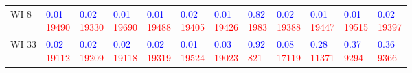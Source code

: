 \begin{tabular}{llllllllllll}
WI 8 & \makecell{\textcolor{blue}{0.01} \\ \textcolor{red}{19490}} & \makecell{\textcolor{blue}{0.02} \\ \textcolor{red}{19330}} & \makecell{\textcolor{blue}{0.01} \\ \textcolor{red}{19690}} & \makecell{\textcolor{blue}{0.01} \\ \textcolor{red}{19488}} & \makecell{\textcolor{blue}{0.02} \\ \textcolor{red}{19405}} & \makecell{\textcolor{blue}{0.01} \\ \textcolor{red}{19426}} & \makecell{\textcolor{blue}{0.82} \\ \textcolor{red}{1983}} & \makecell{\textcolor{blue}{0.02} \\ \textcolor{red}{19388}} & \makecell{\textcolor{blue}{0.01} \\ \textcolor{red}{19447}} & \makecell{\textcolor{blue}{0.01} \\ \textcolor{red}{19515}} & \makecell{\textcolor{blue}{0.02} \\ \textcolor{red}{19397}} \\
WI 33 & \makecell{\textcolor{blue}{0.02} \\ \textcolor{red}{19112}} & \makecell{\textcolor{blue}{0.02} \\ \textcolor{red}{19209}} & \makecell{\textcolor{blue}{0.02} \\ \textcolor{red}{19118}} & \makecell{\textcolor{blue}{0.02} \\ \textcolor{red}{19319}} & \makecell{\textcolor{blue}{0.01} \\ \textcolor{red}{19524}} & \makecell{\textcolor{blue}{0.03} \\ \textcolor{red}{19023}} & \makecell{\textcolor{blue}{0.92} \\ \textcolor{red}{821}} & \makecell{\textcolor{blue}{0.08} \\ \textcolor{red}{17119}} & \makecell{\textcolor{blue}{0.28} \\ \textcolor{red}{11371}} & \makecell{\textcolor{blue}{0.37} \\ \textcolor{red}{9294}} & \makecell{\textcolor{blue}{0.36} \\ \textcolor{red}{9366}} \\

\end{tabular}
